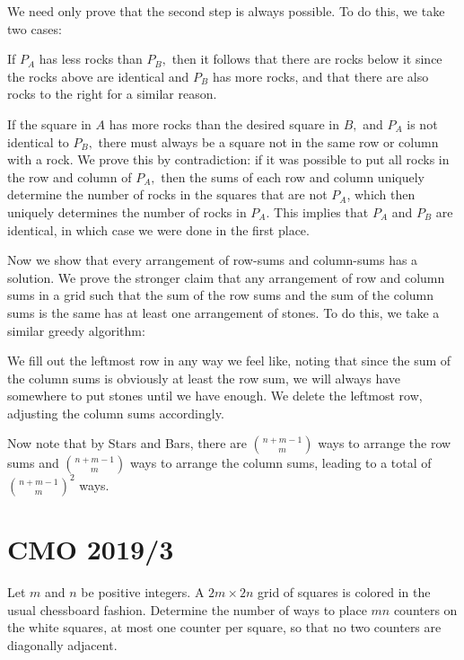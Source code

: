 \documentclass{article}
\begin{document}
We need only prove that the second step is always possible. To do this, we take two cases:
\begin{itemize}
\Item If $P_A$ has less rocks than $P_B,$ then it follows that there are rocks below it since the rocks above are identical and $P_B$ has more rocks, and that there are also rocks to the right for a similar reason.

\Item If the square in $A$ has more rocks than the desired square in $B,$ and $P_A$ is not identical to $P_B,$ there must always be a square not in the same row or column with a rock. We prove this by contradiction: if it was possible to put all rocks in the row and column of $P_A,$ then the sums of each row and column uniquely determine the number of rocks in the squares that are not $P_A$, which then uniquely determines the number of rocks in $P_A.$ This implies that $P_A$ and $P_B$ are identical, in which case we were done in the first place.
\end{itemize}

Now we show that every arrangement of row-sums and column-sums has a solution. We prove the stronger claim that any arrangement of row and column sums in a grid such that the sum of the row sums and the sum of the column sums is the same has at least one arrangement of stones. To do this, we take a similar greedy algorithm:

\begin{itemize}
\Item We fill out the leftmost row in any way we feel like, noting that since the sum of the column sums is obviously at least the row sum, we will always have somewhere to put stones until we have enough.
\Item We delete the leftmost row, adjusting the column sums accordingly.
\end{itemize}

Now note that by Stars and Bars, there are $\binom{n+m-1}{m}$ ways to arrange the row sums and $\binom{n+m-1}{m}$ ways to arrange the column sums, leading to a total of $\binom{n+m-1}{m}^2$ ways.

\pagebreak\section{CMO 2019/3}

Let $m$ and $n$ be positive integers. A $2m\times 2n$ grid of squares is colored in the usual chessboard fashion. Determine the number of ways to place $mn$ counters on the white squares, at most one counter per square, so that no two counters are diagonally adjacent.
\end{document}
